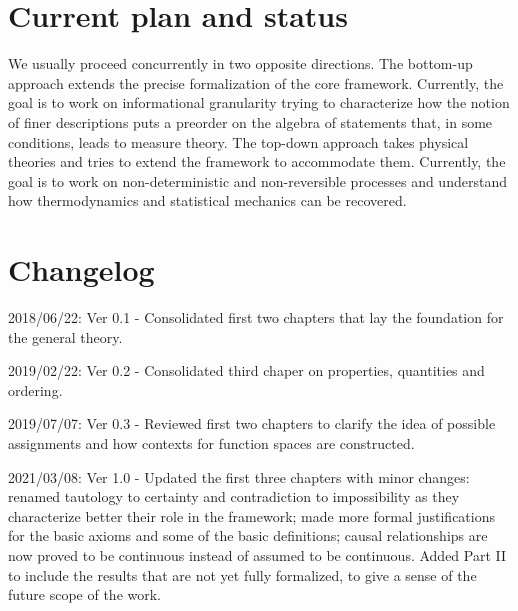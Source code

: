 \documentclass[11pt,letterpaper,fleqn]{memoir} %
\begin{document}
\section*{Current plan and status}

We usually proceed concurrently in two opposite directions. The bottom-up approach extends the precise formalization of the core framework. Currently, the goal is to work on informational granularity trying to characterize how the notion of finer descriptions puts a preorder on the algebra of statements that, in some conditions, leads to measure theory. The top-down approach takes physical theories and tries to extend the framework to accommodate them. Currently, the goal is to work on non-deterministic and non-reversible processes and understand how thermodynamics and statistical mechanics can be recovered.

\section*{Changelog}

\begin{description}
	\item 2018/06/22: Ver 0.1 - Consolidated first two chapters that lay the foundation for the general theory.
	\item 2019/02/22: Ver 0.2 - Consolidated third chaper on properties, quantities and ordering.
	\item 2019/07/07: Ver 0.3 - Reviewed first two chapters to clarify the idea of possible assignments and how contexts for function spaces are constructed.
	\item 2021/03/08: Ver 1.0 - Updated the first three chapters with minor changes: renamed tautology to certainty and contradiction to impossibility as they characterize better their role in the framework; made more formal justifications for the basic axioms and some of the basic definitions; causal relationships are now proved to be continuous instead of assumed to be continuous. Added Part II to include the results that are not yet fully formalized, to give a sense of the future scope of the work.
\end{description}


\cleardoublepage %

\tableofcontents* %

\cleardoublepage %
\end{document}
